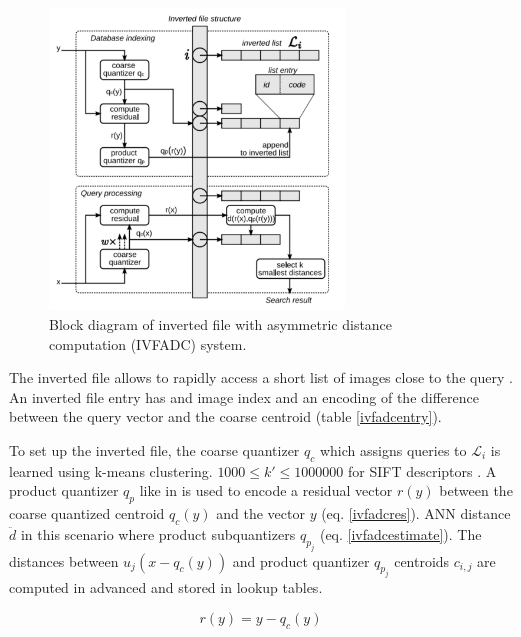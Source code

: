 \documentclass[english,12pt,a4paper,pdftex,elec,utf8, table]{aaltothesis}
\begin{document}
\begin{figure}[htb]
\begin{center}
\includegraphics[height=8cm]{figures/ivfadc}
\end{center}
\caption{Block diagram of inverted file with asymmetric distance computation (IVFADC) system. \cite{Jegou2008}}
\label{ivfadcfig}
\end{figure}
The inverted file allows to rapidly access a short list of images close to the query \cite{Jegou2008}. An inverted file entry has and image index and an encoding of the difference between the query vector and the coarse centroid (table \ref{ivfadcentry}).

To set up the inverted file, the coarse quantizer $q_c$ which assigns queries to $\mathcal{L}_i$ is learned using k-means clustering. $1000 \leq k' \leq 1000000$ for SIFT descriptors \cite{Jegou2008}. A product quantizer $q_p$ like in \cite{Sivic2003} is used to encode a residual vector $r(y)$ between the coarse quantized centroid $q_c(y)$ and the vector $y$ (eq. \ref{ivfadcres}). ANN distance $\ddot{d}$ in this scenario where product subquantizers $q_{p_j}$ (eq. \ref{ivfadcestimate}). The distances between $u_j(x-q_c(y))$
and product quantizer $q_{p_j}$ centroids $c_{i,j}$ are computed in advanced and stored in lookup tables. \cite{Jegou2008}

\begin{equation}
  \label{ivfadcres}
r(y) = y - q_c(y)
\end{equation}
\end{document}
